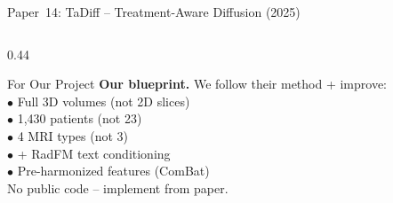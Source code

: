 \documentclass[aspectratio=169,xcolor=dvipsnames]{beamer}
\begin{document}
\begin{frame}{Paper~14: TaDiff -- Treatment-Aware Diffusion (2025)}
\begin{columns}
\begin{column}{0.44\textwidth}
            \vspace{0.1em}

            \begin{alertblock}{For Our Project}
                \scriptsize
                \textbf{Our blueprint.} We follow their method + improve:\\[0.1em]
                $\bullet$ Full 3D volumes (not 2D slices)\\
                $\bullet$ 1,430 patients (not 23)\\
                $\bullet$ 4 MRI types (not 3)\\
                $\bullet$ + RadFM text conditioning\\
                $\bullet$ Pre-harmonized features (ComBat)\\[0.1em]
                No public code -- implement from paper.
            \end{alertblock}
        \end{column}
    \end{columns}
\end{frame}
\end{document}
